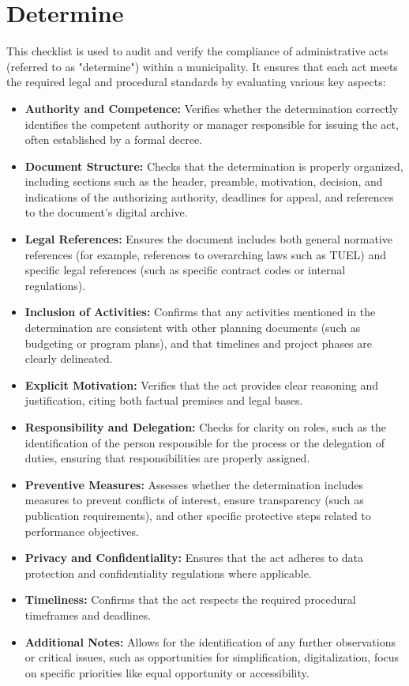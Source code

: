 \documentclass[../main.tex]{subfiles}
\begin{document}
\section*{Determine}
This checklist is used to audit and verify the compliance of administrative acts (referred to as "determine") within a municipality. It ensures that each act meets the required legal and procedural standards by evaluating various key aspects:

\begin{itemize}
    \item \textbf{Authority and Competence:}
 Verifies whether the determination correctly identifies the competent authority or manager responsible for issuing the act, often established by a formal decree.
    \item \textbf{Document Structure:}
 Checks that the determination is properly organized, including sections such as the header, preamble, motivation, decision, and indications of the authorizing authority, deadlines for appeal, and references to the document's digital archive.
    \item \textbf{Legal References:}
 Ensures the document includes both general normative references (for example, references to overarching laws such as TUEL) and specific legal references (such as specific contract codes or internal regulations).
    \item \textbf{Inclusion of Activities:}
 Confirms that any activities mentioned in the determination are consistent with other planning documents (such as budgeting or program plans), and that timelines and project phases are clearly delineated.
    \item \textbf{Explicit Motivation:}
 Verifies that the act provides clear reasoning and justification, citing both factual premises and legal bases.
    \item \textbf{Responsibility and Delegation:}
 Checks for clarity on roles, such as the identification of the person responsible for the process or the delegation of duties, ensuring that responsibilities are properly assigned.
    \item \textbf{Preventive Measures:}
 Assesses whether the determination includes measures to prevent conflicts of interest, ensure transparency (such as publication requirements), and other specific protective steps related to performance objectives.
    \item \textbf{Privacy and Confidentiality:}
 Ensures that the act adheres to data protection and confidentiality regulations where applicable.
    \item \textbf{Timeliness:}
 Confirms that the act respects the required procedural timeframes and deadlines.
    \item \textbf{Additional Notes:}
 Allows for the identification of any further observations or critical issues, such as opportunities for simplification, digitalization, focus on specific priorities like equal opportunity or accessibility.
\end{itemize}

\end{document}
